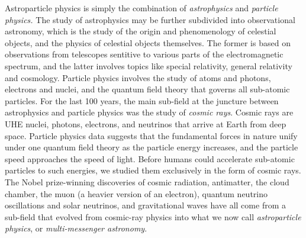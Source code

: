 \documentclass[../main.tex]{subfiles}
\begin{document}
Astroparticle physics is simply the combination of \textit{astrophysics} and \textit{particle physics.}  The study of astrophysics may be further subdivided into observational astronomy, which is the study of the origin and phenomenology of celestial objects, and the physics of celestial objects themselves.  The former is based on observations from telescopes sentitive to various parts of the electromagnetic spectrum, and the latter involves topics like special relativity, general relativity and cosmology.  Particle physics involves the study of atoms and photons, electrons and nuclei, and the quantum field theory that governs all sub-atomic particles.  For the last 100 years, the main sub-field at the juncture between astrophysics and particle physics was the study of \textit{cosmic rays}.  Cosmic rays are UHE nuclei, photons, electrons, and neutrinos that arrive at Earth from deep space.  Particle physics data suggests that the fundamental forces in nature unify under one quantum field theory as the particle energy increases, and the particle speed approaches the speed of light.  Before humans could accelerate sub-atomic particles to such energies, we studied them exclusively in the form of cosmic rays.  The Nobel prize-winning discoveries of cosmic radiation, antimatter, the cloud chamber, the muon (a heavier version of an electron), quantum neutrino oscillations and solar neutrinos, and gravitational waves have all come from a sub-field that evolved from cosmic-ray physics into what we now call \textit{astroparticle physics}, or \textit{multi-messenger astronomy}. \\ \hspace{0.1cm}
\end{document}
